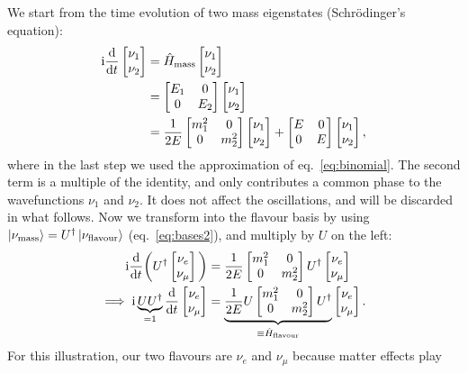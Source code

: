 We start from the time evolution of two mass eigenstates (Schrödinger's
equation):
\begin{align}
	\mathrm{i} \frac{\mathrm{d}}{\mathrm{d} t} \begin{bmatrix} \nu_1 \\ \nu_2 \end{bmatrix}
		&= \hat{H}_\text{mass} \begin{bmatrix} \nu_1 \\ \nu_2
		\end{bmatrix}\nonumber \\
		&= \begin{bmatrix} E_1 & 0 \\ 0 & E_2 \end{bmatrix} \begin{bmatrix} \nu_1
\\ \nu_2 \end{bmatrix}\nonumber \\
&= \frac{1}{2E} \begin{bmatrix}m^2_1 & 0 \\ 0 & m^2_2\end{bmatrix} \begin{bmatrix}\nu_1 \\ \nu_2\end{bmatrix} + \begin{bmatrix}E &
0 \\ 0 & E\end{bmatrix} \begin{bmatrix}\nu_1 \\ \nu_2\end{bmatrix},\label{eq:massvacuum}
\end{align}
where in the last step we used the approximation of eq.~\ref{eq:binomial}.
The second term is a multiple of the identity, and only contributes a common phase to
the wavefunctions $\nu_1$ and $\nu_2$. It does not affect the oscillations, and
will be discarded in what follows.
Now we transform into the flavour basis by using $\ket{\nu_\text{mass}} =
U^\dagger \ket{\nu_\text{flavour}}$ (eq.~\ref{eq:bases2}), and multiply by $U$ on the left:
\begin{align*}
	\mathrm{i} \frac{\mathrm{d}}{\mathrm{d} t}\bigg( U^\dagger \begin{bmatrix} \nu_e \\ \nu_\mu
	\end{bmatrix}\bigg)
		&= \frac{1}{2E}\begin{bmatrix}m^2_1 & 0 \\ 0 & m^2_2\end{bmatrix} U^\dagger \begin{bmatrix}\nu_e
			\\ \nu_\mu\end{bmatrix} \\
		\implies 
	\mathrm{i} \underbrace{U U^\dagger}_{=1} \frac{\mathrm{d}}{\mathrm{d} t}\begin{bmatrix}\nu_e \\ \nu_\mu\end{bmatrix}
		&= \underbrace{\frac{1}{2E} U \begin{bmatrix}m^2_1 & 0 \\ 0 & m^2_2\end{bmatrix}
			U^\dagger }_{\equiv \hat{H}_{\text{flavour}}} \begin{bmatrix}\nu_e
			\\ \nu_\mu\end{bmatrix}.
\end{align*}
For this illustration, our two flavours are $\nu_e$ and $\nu_\mu$ because matter effects play
